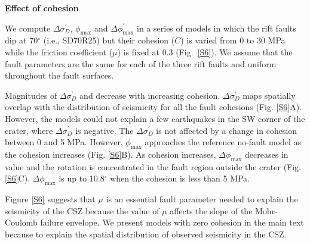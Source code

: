 \documentclass[draft,jgrga]{agutexSI2019}
\begin{document}
\begin{article}
\noindent\textbf{Effect of cohesion}

We compute $\Delta \sigma_{D}^{\prime}$, $\phi_{\max}$ and $\Delta \phi_{\max}^{\prime}$ in a series of models in which the rift faults dip at 70$^{\circ}$ (i.e., SD70R25) but their cohesion ($C$) is varied from 0 to 30 MPa while the friction coefficient ($\mu$) is fixed at 0.3 (Fig.~\ref{S6}). We assume that the fault parameters are the same for each of the three rift faults and uniform throughout the fault surfaces. %

Magnitudes of $\Delta\sigma_D^{\prime}$ and  decrease with increasing cohesion. $\Delta\sigma_D^{\prime}$ maps spatially overlap with the distribution of seismicity for all the fault cohesions (Fig. \ref{S6}A). However, the models could not explain a few earthquakes in the SW corner of the crater, where $\Delta\sigma_D^{\prime}$ is negative. The $\Delta\sigma_D^{\prime}$ is not affected by a change in cohesion between 0 and 5 MPa. However, $\phi_{\max}$ approaches the reference no-fault model as the cohesion increases (Fig. \ref{S6}B). As cohesion increases, $\Delta\phi_{\max}$ decreases in value and the rotation is concentrated in the fault region outside the crater (Fig. \ref{S6}C). $\Delta\phi_{\max}$ is up to 10.8$^\circ$ when the cohesion is less than 5 MPa. 

 Figure \ref{S6} suggests that $\mu$ is an essential fault parameter needed to explain the seismicity of the CSZ because the value of $\mu$ affects the slope of the Mohr-Coulomb failure envelope. We present models with zero cohesion in the main text because to explain the spatial distribution of observed seismicity in the CSZ. 

\vspace{10mm} %


\end{article}
\end{document}
